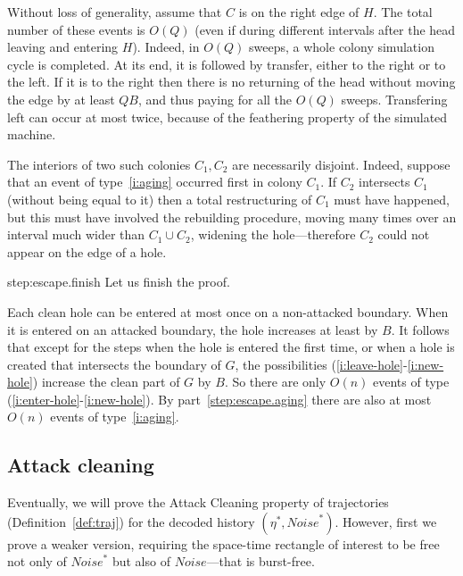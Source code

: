 \documentclass[12pt]{memoir}
\def\B{B}
\def\G{G}
\newcommand{\Noise}{\mathit{Noise}}
\newcommand{\Q}{Q}
\begin{document}
\begin{Proof}
\begin{pproof}
Without loss of generality, assume that \( C \) is on the right edge of \( H \).
The total number of these events  is \( O(\Q) \) (even if during different intervals
after the head leaving and entering \( H \)).
Indeed, in \( O(\Q) \) sweeps, a whole colony simulation cycle is completed.
At its end, it is followed by transfer, either to the right or to the left.
If it is to the right then there is no returning of the head without
moving the edge by at least \( \Q\B \), and thus paying for all the \( O(\Q) \) sweeps.
Transfering left can occur at most twice, because of the feathering property of the simulated 
machine.

The interiors of two such colonies \( C_{1},C_{2} \) are necessarily disjoint.
Indeed, suppose that an event of type~\eqref{i:aging} occurred first in colony \( C_{1} \).
If \( C_{2} \) intersects \( C_{1} \) (without being equal to it) then a 
total restructuring of \( C_{1} \) must have happened,
but this must have involved the rebuilding procedure, moving many times over an interval much wider than 
\( C_{1}\cup C_{2} \), widening the hole---therefore \( C_{2} \) could not appear on the edge of a hole.
\end{pproof} %

\begin{step+}{step:escape.finish}
Let us finish the proof.
\end{step+}
\begin{prooof}
Each clean hole can be entered at most once on a non-attacked boundary.
When it is entered on an attacked boundary, the hole increases at least by \( \B \).
It follows that except for the steps when the hole is entered the first time, 
or when a hole is created that intersects the boundary of \( \G \), the possibilities
(\ref{i:leave-hole}-\ref{i:new-hole}) increase the clean part of \( \G \) by \( \B \).
So there are only \( O(n) \) events of type (\ref{i:enter-hole}-\ref{i:new-hole}).
By part~\ref{step:escape.aging} there are also at most \( O(n) \) events of type~\eqref{i:aging}.
\end{prooof} %
\end{Proof}

\subsection{Attack cleaning}

Eventually, we will prove the Attack Cleaning property of trajectories (Definition~\ref{def:traj}) for the 
decoded history \( (\eta^{*},\Noise^{*}) \).
However, first we prove a weaker version, requiring the space-time rectangle of interest to be free
not only of \( \Noise^{*} \) but also of \( \Noise \)---that is burst-free.
\end{document}

